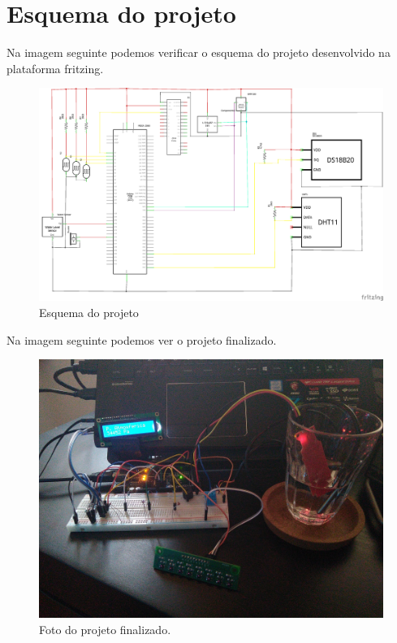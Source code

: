 \documentclass[11pt]{report}
\begin{document}
\chapter*{Esquema do projeto}

Na imagem seguinte podemos verificar o esquema do projeto desenvolvido na plataforma fritzing.

\begin{figure} [!h]
\centering
\includegraphics[width=\textwidth]{Prints/esquema.png}
\caption{Esquema do projeto}
\label{Rotulo}
\end{figure}

\newpage
Na imagem seguinte podemos ver o projeto finalizado.

\begin{figure} [!h]
\centering
\includegraphics[width=\textwidth]{Prints/projecto.png}
\caption{Foto do projeto finalizado.}
\label{Rotulo}
\end{figure}
\end{document}
